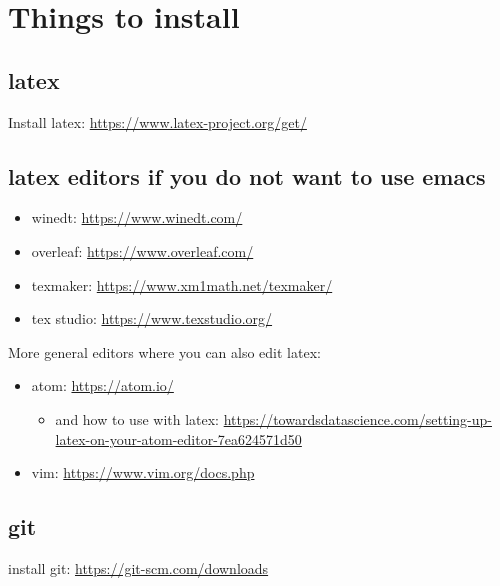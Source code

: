 \documentclass[11pt]{article}
\begin{document}







\newpage
\appendix


\section{Things to install}
\label{sec:install}

\subsection{latex}

Install latex: \url{https://www.latex-project.org/get/}



\subsection{latex editors if you do not want to use emacs}

\begin{itemize}
\item winedt: \url{https://www.winedt.com/}
\item overleaf: \url{https://www.overleaf.com/}
\item texmaker: \url{https://www.xm1math.net/texmaker/}
\item tex studio: \url{https://www.texstudio.org/}
\end{itemize}

More general editors where you can also edit latex:

\begin{itemize}
\item atom: \url{https://atom.io/}
\begin{itemize}
\item and how to use with latex: \url{https://towardsdatascience.com/setting-up-latex-on-your-atom-editor-7ea624571d50}
\end{itemize}
\item vim: \url{https://www.vim.org/docs.php}
\end{itemize}


\subsection{git}

install git: \url{https://git-scm.com/downloads}
\end{document}
